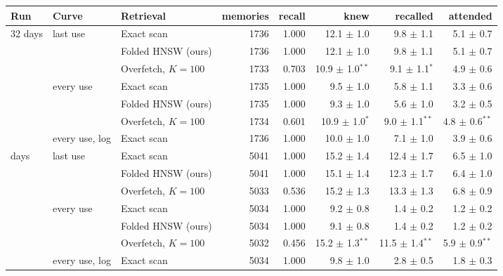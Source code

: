 \begin{tabular}{l l l r r r r r}
\toprule
Run & Curve & Retrieval & memories & recall & knew & recalled & attended\\
\midrule
32 days & last use & Exact scan & 1736 & 1.000 & 12.1 $\pm$ 1.0 & 9.8 $\pm$ 1.1 & 5.1 $\pm$ 0.7\\
 &  & Folded HNSW (ours) & 1736 & 1.000 & 12.1 $\pm$ 1.0 & 9.8 $\pm$ 1.1 & 5.1 $\pm$ 0.7\\
 &  & Overfetch, $K{=}100$ & 1733 & 0.703 & 10.9 $\pm$ 1.0$^{**}$ & 9.1 $\pm$ 1.1$^{*}$ & 4.9 $\pm$ 0.6\\
\addlinespace[2pt]
 & every use & Exact scan & 1735 & 1.000 & 9.5 $\pm$ 1.0 & 5.8 $\pm$ 1.1 & 3.3 $\pm$ 0.6\\
 &  & Folded HNSW (ours) & 1735 & 1.000 & 9.3 $\pm$ 1.0 & 5.6 $\pm$ 1.0 & 3.2 $\pm$ 0.5\\
 &  & Overfetch, $K{=}100$ & 1734 & 0.601 & 10.9 $\pm$ 1.0$^{*}$ & 9.0 $\pm$ 1.1$^{**}$ & 4.8 $\pm$ 0.6$^{**}$\\
\addlinespace[2pt]
 & every use, log & Exact scan & 1736 & 1.000 & 10.0 $\pm$ 1.0 & 7.1 $\pm$ 1.0 & 3.9 $\pm$ 0.6\\
\addlinespace
92 days & last use & Exact scan & 5041 & 1.000 & 15.2 $\pm$ 1.4 & 12.4 $\pm$ 1.7 & 6.5 $\pm$ 1.0\\
 &  & Folded HNSW (ours) & 5041 & 1.000 & 15.1 $\pm$ 1.4 & 12.3 $\pm$ 1.7 & 6.4 $\pm$ 1.0\\
 &  & Overfetch, $K{=}100$ & 5033 & 0.536 & 15.2 $\pm$ 1.3 & 13.3 $\pm$ 1.3 & 6.8 $\pm$ 0.9\\
\addlinespace[2pt]
 & every use & Exact scan & 5034 & 1.000 & 9.2 $\pm$ 0.8 & 1.4 $\pm$ 0.2 & 1.2 $\pm$ 0.2\\
 &  & Folded HNSW (ours) & 5034 & 1.000 & 9.1 $\pm$ 0.8 & 1.4 $\pm$ 0.2 & 1.2 $\pm$ 0.2\\
 &  & Overfetch, $K{=}100$ & 5032 & 0.456 & 15.2 $\pm$ 1.3$^{**}$ & 11.5 $\pm$ 1.4$^{**}$ & 5.9 $\pm$ 0.9$^{**}$\\
\addlinespace[2pt]
 & every use, log & Exact scan & 5034 & 1.000 & 9.8 $\pm$ 1.0 & 2.8 $\pm$ 0.5 & 1.8 $\pm$ 0.3\\
\bottomrule
\end{tabular}
